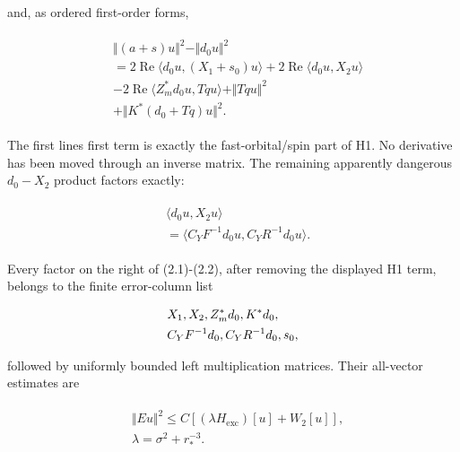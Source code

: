 and, as ordered first-order forms,

\begin{gather*}
\begin{aligned}
& \Vert (a+s)u\Vert ^{2}-\Vert d_{0} u\Vert ^{2} \\
& =2 \operatorname{Re} \langle d_{0} u,(X_{1}+s_{0})u\rangle  + 2 \operatorname{Re} \langle d_{0} u,X_{2} u\rangle \\
& -2 \operatorname{Re} \langle Z_{m}^{*}d_{0} u,Tq u\rangle  +\Vert Tq u\Vert ^{2} \\
& +\Vert K^{*}(d_{0}+Tq)u\Vert ^{2}.
\end{aligned}\tag{2.1}
\end{gather*}

The first line\textquotesingle s first term is exactly the
fast-orbital/spin part of H1. No derivative has been moved through an
inverse matrix. The remaining apparently dangerous \(d_{0}-X_{2}\)
product factors exactly:

\begin{gather*}
\begin{aligned}
& \langle d_{0} u,X_{2} u\rangle \\
& =\langle C_{Y} F^{-1}d_{0} u,C_{Y} R^{-1}d_{0} u\rangle .
\end{aligned}\tag{2.2}
\end{gather*}

Every factor on the right of (2.1)-(2.2), after removing the displayed
H1 term, belongs to the finite error-column list

\begin{gather*}
\begin{aligned}
& X_{1}, X_{2}, Z_{m}^{*}d_{0}, K^{*}d_{0}, \\
& C_{Y} F^{-1}d_{0}, C_{Y} R^{-1}d_{0}, s_{0},
\end{aligned}\notag
\end{gather*}

followed by uniformly bounded left multiplication matrices. Their
all-vector estimates are

\begin{gather*}
\begin{aligned}
& \Vert E u\Vert ^{2} \le  C[(\lambda  H_{\mathrm{exc}})[u]+W_{2}[u]], \\
& \lambda =\sigma ^{2}+r_{*}^{-3}.
\end{aligned}\tag{2.3}
\end{gather*}

